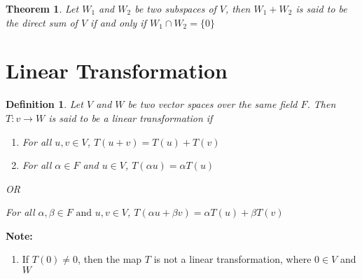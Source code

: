 \documentclass[a4paper, titlepage]{article}
\newtheorem{theorem}{Theorem}[section]
\newtheorem{definition}{Definition}[section]
\begin{document}
        \begin{theorem}
            Let $W_1$ and $W_2$ be two subspaces of $V$, then 
            $W_1 + W_2$ is said to be the direct sum of $V$ if and 
            only if $W_1 \cap W_2 = \{ 0 \}$
        \end{theorem}

        \setlength{\fboxsep}{1em}
        \noindent{}

\section{Linear Transformation}
    \begin{definition}
        Let $V$ and $W$ be two vector spaces over the same field $F$. Then
        $T : v \rightarrow W$ is said to be a linear transformation if 
        \begin{enumerate}[label=(\alph*)]
            \item For all $u, v \in V$, $T(u + v) = T(u) + T(v)$
            \item For all $\alpha \in F$ and $u \in V$, $T(\alpha u) = \alpha T(u)$
        \end{enumerate}
        \begin{center}
            OR
        \end{center}
        For all $\alpha, \beta \in F \text{ and }u, v \in V$, $T(\alpha u + \beta v) = \alpha T(u) + \beta T(v)$    
    \end{definition}
    \textbf{Note: }
    \begin{enumerate}[label=(\roman*)]
        \item If $T(0) \neq 0$, then the map $T$ is not a linear transformation,
        where $0 \in V$ and $W$
    \end{enumerate}
\end{document}
